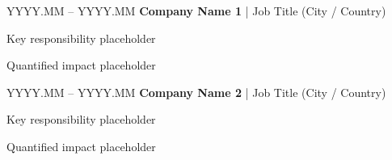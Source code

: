 \begin{twocolentry}{YYYY.MM -- YYYY.MM}
  \textbf{Company Name 1} | Job Title (City / Country)
\end{twocolentry}

\begin{onecolentry}
  \begin{highlights}
    \item Key responsibility placeholder
    \item Quantified impact placeholder
  \end{highlights}
\end{onecolentry}

\entrysep

\begin{twocolentry}{YYYY.MM -- YYYY.MM}
  \textbf{Company Name 2} | Job Title (City / Country)
\end{twocolentry}

\begin{onecolentry}
  \begin{highlights}
    \item Key responsibility placeholder
    \item Quantified impact placeholder
  \end{highlights}
\end{onecolentry}
